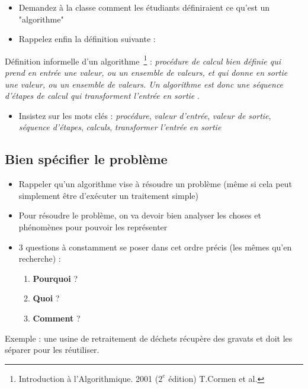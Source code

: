 \documentclass[11pt,a4paper]{article}
\begin{document}
\begin{itemize}
\item Demandez à la classe comment les étudiants définiraient ce qu'est un "algorithme"
\item Rappelez enfin la définition suivante :
\end{itemize}

\smallskip

Définition informelle d'un algorithme~\footnote{Introduction à l'Algorithmique. 2001 ($2^{e}$ édition) T.Cormen et al.} : \og \textit{procédure de calcul bien définie qui prend en entrée une valeur, ou un ensemble de valeurs, et qui donne en sortie une valeur, ou un ensemble de valeurs. Un algorithme est donc une séquence d'étapes de calcul qui transforment l'entrée en sortie} \fg .

\begin{itemize}
\item Insistez sur les mots clés : \textit{procédure}, \textit{valeur d'entrée}, \textit{valeur de sortie}, \textit{séquence d'étapes}, \textit{calculs}, \textit{transformer l'entrée en sortie}
\end{itemize}

\bigskip


\subsection{Bien spécifier le problème}

\begin{itemize}
\item Rappeler qu'un algorithme vise à résoudre un problème (même si cela peut simplement être d'exécuter un traitement simple)
\item Pour résoudre le problème, on va devoir bien analyser les choses et phénomènes pour pouvoir les représenter
\item 3 questions à constamment se poser dans cet ordre précis (les mêmes qu'en recherche) :
  \begin{enumerate}
  \item \textbf{Pourquoi} ?
  \item \textbf{Quoi} ?
  \item \textbf{Comment} ?
  \end{enumerate}
\end{itemize}


Exemple : une usine de retraitement de déchets récupère des gravats et doit les séparer pour les réutiliser.
\end{document}
